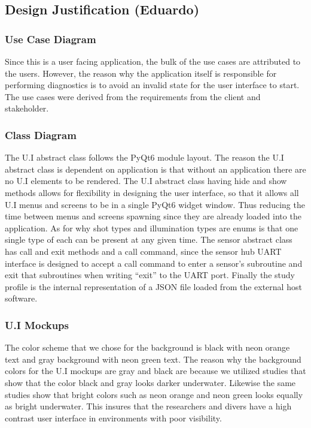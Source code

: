 \subsection{Design Justification (Eduardo)}
\subsubsection{Use Case Diagram}
Since this is a user facing application, the bulk of the use cases are attributed to the users. However, the reason why the application itself is responsible for performing diagnostics is to avoid an invalid state for the user interface to start. The use cases were derived from the requirements from the client and stakeholder.
\subsubsection{Class Diagram}
The U.I abstract class follows the PyQt6 module layout. The reason the U.I abstract class is dependent on application is that without an application there are no U.I elements to be rendered. The U.I abstract class having hide and show methods allows for flexibility in designing the user interface, so that it allows all U.I menus and screens to be in a single PyQt6 widget window. Thus reducing the time between menus and screens spawning since they are already loaded into the application. As for why shot types and illumination types are enums is that one single type of each can be present at any given time. The sensor abstract class has call and exit methods and a call command, since the sensor hub UART interface is designed to accept a call command to enter a sensor's subroutine and exit that subroutines when writing ``exit'' to the UART port. Finally the study profile is the internal representation of a JSON file loaded from the external host software.
\subsubsection{U.I Mockups}
The color scheme that we chose for the background is black with neon orange text and gray background with neon green text. The reason why the background colors for the U.I mockups are gray and black are because we utilized studies that show that the color black and gray looks darker underwater.\cite{AquaticSafetyGroup2021}\cite{FluoGreenMost2018} Likewise the same studies show that bright colors such as neon orange and neon green looks equally as bright underwater.\cite{AquaticSafetyGroup2021}\cite{FluoGreenMost2018} This insures that the researchers and divers have a high contrast user interface in environments with poor visibility.
